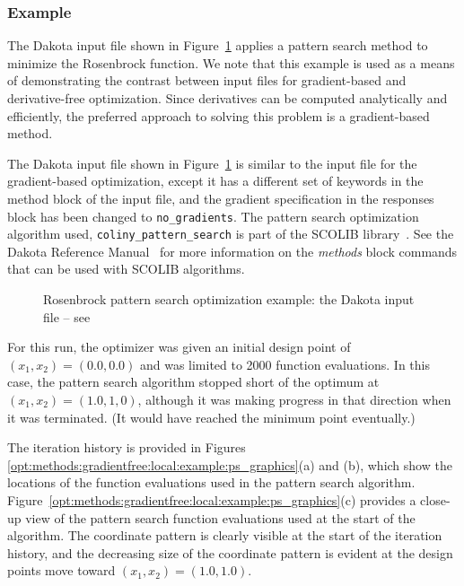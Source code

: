 \subsubsection{Example}
\label{opt:methods:gradientfree:local:example}

The Dakota input file shown in
Figure~\ref{opt:methods:gradientfree:local:example:ps} applies a
pattern search method to minimize the Rosenbrock function. We note
that this example is used as a means of demonstrating the contrast
between input files for gradient-based and derivative-free
optimization.  Since derivatives can be computed analytically and
efficiently, the preferred approach to solving this problem is a
gradient-based method.

The Dakota input file shown in
Figure~\ref{opt:methods:gradientfree:local:example:ps} is similar to
the input file for the gradient-based optimization, except it has a
different set of keywords in the method block of the input file, and
the gradient specification in the responses block has been changed to
\texttt{no\_gradients}. The pattern search optimization algorithm
used, \texttt{coliny\_pattern\_search} is part of the SCOLIB
library~\cite{Har06}. See the Dakota Reference Manual~\cite{RefMan}
for more information on the \emph{methods} block commands that can be
used with SCOLIB algorithms.

\begin{figure}[ht!]
  \centering
  \begin{bigbox}
    \begin{small}
    \end{small}
  \end{bigbox}
  \caption{Rosenbrock pattern search optimization example: the Dakota
    input file -- see
    \protect{}
  }
  \label{opt:methods:gradientfree:local:example:ps}
\end{figure}

For this run, the optimizer was given an initial design point of
$(x_1,x_2) = (0.0,0.0)$ and was limited to 2000 function
evaluations. In this case, the pattern search algorithm stopped short
of the optimum at $(x_1,x_2) = (1.0,1,0)$, although it was making
progress in that direction when it was terminated. (It would have
reached the minimum point eventually.)

The iteration history is provided in Figures~
\ref{opt:methods:gradientfree:local:example:ps_graphics}(a) and (b),
which show the locations of the function evaluations used in the
pattern search algorithm.
Figure~\ref{opt:methods:gradientfree:local:example:ps_graphics}(c)
provides a close-up view of the pattern search function evaluations
used at the start of the algorithm. The coordinate pattern is clearly
visible at the start of the iteration history, and the decreasing size
of the coordinate pattern is evident at the design points move toward
$(x_1,x_2) = (1.0,1.0)$.

